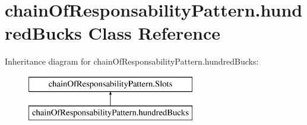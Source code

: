 \hypertarget{classchain_of_responsability_pattern_1_1hundred_bucks}{}\section{chain\+Of\+Responsability\+Pattern.\+hundred\+Bucks Class Reference}
\label{classchain_of_responsability_pattern_1_1hundred_bucks}
Inheritance diagram for chain\+Of\+Responsability\+Pattern.\+hundred\+Bucks\+:\begin{figure}[H]
\begin{center}
\leavevmode
\includegraphics[height=2.000000cm]{classchain_of_responsability_pattern_1_1hundred_bucks}
\end{center}
\end{figure}
